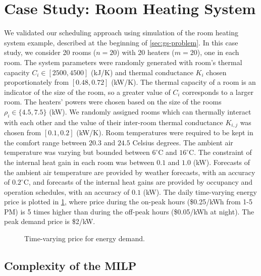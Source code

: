 \section{Case Study: Room Heating System}
\label{sec:simulation}

We validated our scheduling approach using simulation of the room heating system example, described at the beginning of \cref{sec:gs-problem}.
In this case study, we consider 20 rooms ($n=20$) with 20 heaters ($m=20$), one in each room.
The system parameters were randomly generated with room's thermal capacity $C_i \in [2500, 4500]$ (kJ/K) and thermal conductance $K_i$ chosen proportionately from $[0.48,0.72]$ (kW/K).
The thermal capacity of a room is an indicator of the size of the room, so a greater value of $C_{i}$ corresponds to a larger room.
The heaters' powers were chosen based on the size of the rooms $\rho_i \in \{4.5, 7.5\}$ (kW).
We randomly assigned rooms which can thermally interact with each other and the value of their inter-room thermal conductance $K_{i,j}$ was chosen from $[0.1,0.2]$ (kW/K). %
Room temperatures were required to be kept in the comfort range between $20.3$ and $24.5$ Celsius degrees.
The ambient air temperature was varying but bounded between $6^{\circ}\mathrm{C}$ and $16^{\circ}\mathrm{C}$. 
The constraint of the internal heat gain in each room was between $0.1$ and $1.0$ (kW).
Forecasts of the ambient air temperature are provided by weather forecasts, with an accuracy of $0.2^{\circ}\mathrm{C}$, and forecasts of the internal heat gains are provided by occupancy and operation schedules, with an accuracy of $0.1$ (kW).
The daily time-varying energy price is plotted in \cref{fig:simulation:price}, where %
 price during the on-peak hours (\$0.25/kWh from 1-5 PM) is 5 times higher than during the off-peak hours (\$0.05/kWh at night).
The peak demand price is \$2/kW.

\begin{figure}[tb]
  \centering
  
  \caption{Time-varying price for energy demand.}
  \vspace{-10pt}
  \label{fig:simulation:price}
\end{figure}


\subsection{Complexity of the MILP} %
\label{sec:simulation:milp}

